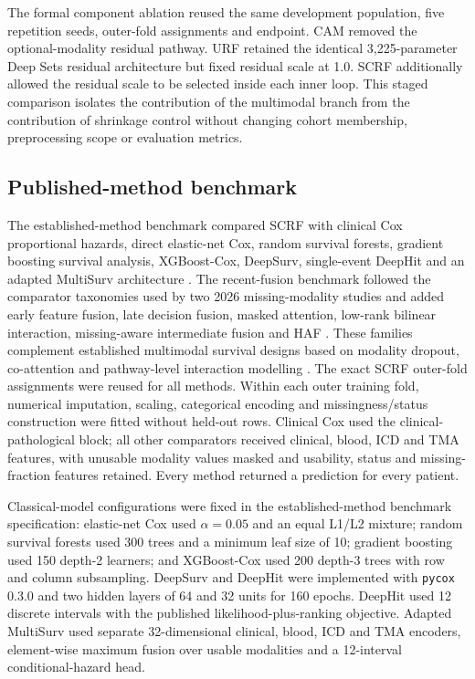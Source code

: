 \documentclass[pdflatex,sn-nature]{sn-jnl}
\begin{document}
The formal component ablation reused the same development population, five repetition seeds, outer-fold assignments and endpoint. CAM removed the optional-modality residual pathway. URF retained the identical 3,225-parameter Deep Sets residual architecture but fixed residual scale at 1.0. SCRF additionally allowed the residual scale to be selected inside each inner loop. This staged comparison isolates the contribution of the multimodal branch from the contribution of shrinkage control without changing cohort membership, preprocessing scope or evaluation metrics.

\subsection{Published-method benchmark}
The established-method benchmark compared SCRF with clinical Cox proportional hazards, direct elastic-net Cox, random survival forests, gradient boosting survival analysis, XGBoost-Cox, DeepSurv, single-event DeepHit and an adapted MultiSurv architecture \cite{cox1972,simon2011,ishwaran2008,hothorn2006,chen2016,katzman2018,lee2018,valesilva2021}. The recent-fusion benchmark followed the comparator taxonomies used by two 2026 missing-modality studies and added early feature fusion, late decision fusion, masked attention, low-rank bilinear interaction, missing-aware intermediate fusion and HAF \cite{ruffini2026,zheng2026}. These families complement established multimodal survival designs based on modality dropout, co-attention and pathway-level interaction modelling \cite{cheerla2019,chen2021mcat,jaume2024survpath}. The exact SCRF outer-fold assignments were reused for all methods. Within each outer training fold, numerical imputation, scaling, categorical encoding and missingness/status construction were fitted without held-out rows. Clinical Cox used the clinical-pathological block; all other comparators received clinical, blood, ICD and TMA features, with unusable modality values masked and usability, status and missing-fraction features retained. Every method returned a prediction for every patient.

Classical-model configurations were fixed in the established-method benchmark specification: elastic-net Cox used $\alpha=0.05$ and an equal L1/L2 mixture; random survival forests used 300 trees and a minimum leaf size of 10; gradient boosting used 150 depth-2 learners; and XGBoost-Cox used 200 depth-3 trees with row and column subsampling. DeepSurv and DeepHit were implemented with \texttt{pycox} 0.3.0 and two hidden layers of 64 and 32 units for 160 epochs. DeepHit used 12 discrete intervals with the published likelihood-plus-ranking objective. Adapted MultiSurv used separate 32-dimensional clinical, blood, ICD and TMA encoders, element-wise maximum fusion over usable modalities and a 12-interval conditional-hazard head.
\end{document}
